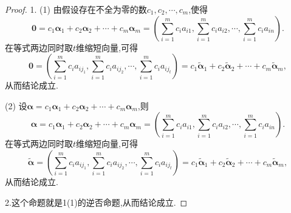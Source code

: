 \documentclass[../../main.tex]{subfiles}%
\begin{document}
\begin{proof}

1. (1) 由假设存在不全为零的数\(c_1,c_2,\cdots,c_m\),使得
\[
\boldsymbol{0}=c_1\boldsymbol{\alpha}_1 + c_2\boldsymbol{\alpha}_2+\cdots + c_m\boldsymbol{\alpha}_m=\left(\sum_{i = 1}^{m}c_ia_{i1},\sum_{i = 1}^{m}c_ia_{i2},\cdots,\sum_{i = 1}^{m}c_ia_{in}\right).
\]
在等式两边同时取\(t\)维缩短向量,可得
\[
\boldsymbol{0}=\left(\sum_{i = 1}^{m}c_ia_{ij_1},\sum_{i = 1}^{m}c_ia_{ij_2},\cdots,\sum_{i = 1}^{m}c_ia_{ij_t}\right)=c_1\widetilde{\boldsymbol{\alpha}}_1 + c_2\widetilde{\boldsymbol{\alpha}}_2+\cdots + c_m\widetilde{\boldsymbol{\alpha}}_m,
\]
从而结论成立.

(2) 设\(\boldsymbol{\alpha}=c_1\boldsymbol{\alpha}_1 + c_2\boldsymbol{\alpha}_2+\cdots + c_m\boldsymbol{\alpha}_m\),则
\[
\boldsymbol{\alpha}=c_1\boldsymbol{\alpha}_1 + c_2\boldsymbol{\alpha}_2+\cdots + c_m\boldsymbol{\alpha}_m=\left(\sum_{i = 1}^{m}c_ia_{i1},\sum_{i = 1}^{m}c_ia_{i2},\cdots,\sum_{i = 1}^{m}c_ia_{in}\right).
\]
在等式两边同时取\(t\)维缩短向量,可得
\[
\widetilde{\boldsymbol{\alpha}}=\left(\sum_{i = 1}^{m}c_ia_{ij_1},\sum_{i = 1}^{m}c_ia_{ij_2},\cdots,\sum_{i = 1}^{m}c_ia_{ij_t}\right)=c_1\widetilde{\boldsymbol{\alpha}}_1 + c_2\widetilde{\boldsymbol{\alpha}}_2+\cdots + c_m\widetilde{\boldsymbol{\alpha}}_m,
\]
从而结论成立. 

2.这个命题就是1(1)的逆否命题,从而结论成立.

\end{proof}
\end{document}
